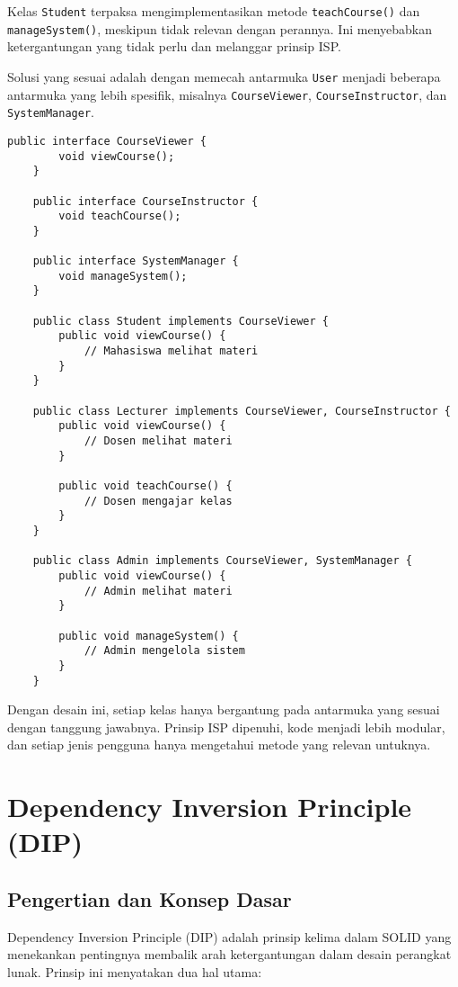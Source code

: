 Kelas \texttt{Student} terpaksa mengimplementasikan metode \texttt{teachCourse()} dan \texttt{manageSystem()}, meskipun tidak relevan dengan perannya. Ini menyebabkan ketergantungan yang tidak perlu dan melanggar prinsip ISP.

Solusi yang sesuai adalah dengan memecah antarmuka \texttt{User} menjadi beberapa antarmuka yang lebih spesifik, misalnya \texttt{CourseViewer}, \texttt{CourseInstructor}, dan \texttt{SystemManager}.

\begin{lstlisting}[style=JavaStyle, caption={Refaktor menggunakan ISP}]
	public interface CourseViewer {
		void viewCourse();
	}
	
	public interface CourseInstructor {
		void teachCourse();
	}
	
	public interface SystemManager {
		void manageSystem();
	}
	
	public class Student implements CourseViewer {
		public void viewCourse() {
			// Mahasiswa melihat materi
		}
	}
	
	public class Lecturer implements CourseViewer, CourseInstructor {
		public void viewCourse() {
			// Dosen melihat materi
		}
		
		public void teachCourse() {
			// Dosen mengajar kelas
		}
	}
	
	public class Admin implements CourseViewer, SystemManager {
		public void viewCourse() {
			// Admin melihat materi
		}
		
		public void manageSystem() {
			// Admin mengelola sistem
		}
	}
\end{lstlisting}

Dengan desain ini, setiap kelas hanya bergantung pada antarmuka yang sesuai dengan tanggung jawabnya. Prinsip ISP dipenuhi, kode menjadi lebih modular, dan setiap jenis pengguna hanya mengetahui metode yang relevan untuknya.

\section{Dependency Inversion Principle (DIP)}

\subsection{Pengertian dan Konsep Dasar}
Dependency Inversion Principle (DIP) adalah prinsip kelima dalam SOLID yang menekankan pentingnya membalik arah ketergantungan dalam desain perangkat lunak. Prinsip ini menyatakan dua hal utama:

